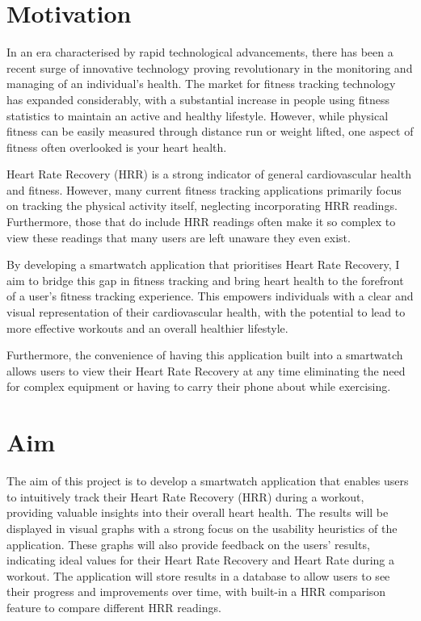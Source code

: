\documentclass{l4proj}
\begin{document}

\section{Motivation}
\label{sec:motivation}

In an era characterised by rapid technological advancements, there has been a recent surge of innovative technology proving revolutionary in the monitoring and managing of an individual’s health. The market for fitness tracking technology has expanded considerably, with a substantial increase in people using fitness statistics to maintain an active and healthy lifestyle. However, while physical fitness can be easily measured through distance run or weight lifted, one aspect of fitness often overlooked is your heart health. 

Heart Rate Recovery (HRR) is a strong indicator of general cardiovascular health and fitness. However, many current fitness tracking applications primarily focus on tracking the physical activity itself, neglecting incorporating HRR readings. Furthermore, those that do include HRR readings often make it so complex to view these readings that many users are left unaware they even exist. 

By developing a smartwatch application that prioritises Heart Rate Recovery, I aim to bridge this gap in fitness tracking and bring heart health to the forefront of a user’s fitness tracking experience. This empowers individuals with a clear and visual representation of their cardiovascular health, with the potential to lead to more effective workouts and an overall healthier lifestyle.

Furthermore, the convenience of having this application built into a smartwatch allows users to view their Heart Rate Recovery at any time eliminating the need for complex equipment or having to carry their phone about while exercising.

\section{Aim}
\label{sec:aim}

The aim of this project is to develop a smartwatch application that enables users to intuitively track their Heart Rate Recovery (HRR) during a workout, providing valuable insights into their overall heart health. The results will be displayed in visual graphs with a strong focus on the usability heuristics of the application. These graphs will also provide feedback on the users' results, indicating ideal values for their Heart Rate Recovery and Heart Rate during a workout. The application will store results in a database to allow users to see their progress and improvements over time, with built-in a HRR comparison feature to compare different HRR readings.
\end{document}
